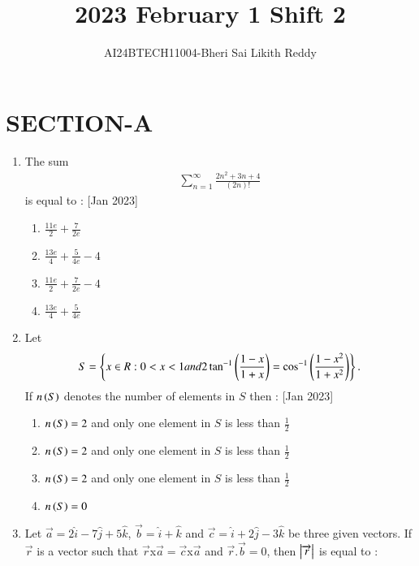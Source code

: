 \documentclass[journal]{IEEEtran}
\begin{document}

\onecolumn
\newpage
\title{2023 February 1 Shift 2}
\author{AI24BTECH11004-Bheri Sai Likith Reddy}
\maketitle
\section{SECTION-A}
\begin{enumerate}
       \item The sum 
            \begin{align*}
	       \sum_{n=1}^\infty \frac{2n^2+3n+4}{(2n)!}
            \end{align*}
	is equal to :
	\hfill{[Jan 2023]}
	       \begin{enumerate}
		       \item $\frac{11e}{2}+\frac{7}{2e}$
		       \item $\frac{13e}{4}+\frac{5}{4e}-4$
		       \item $\frac{11e}{2}+\frac{7}{2e}-4$
		       \item $\frac{13e}{4}+\frac{5}{4e}$
        	\end{enumerate}	
	\item Let 
             \begin{align*}  
		S=\left\{x\in R: 0<x<1 and 2\tan ^{-1}\left(\frac{1-x}{1+x}\right)=\cos ^{-1}\left(\frac{1-x^2}{1+x^2}\right)\right\}.
              \end{align*}
	 If $n\left(S\right)$ denotes the number of elements in $S$ then :
	\hfill{[Jan 2023]}               
               \begin{enumerate}
			       \item $n\left(S\right)=2$ and only one element in $S$ is less than $\frac{1}{2}$
                                \item $n\left(S\right)=2$ and only one element in $S$ is less than $\frac{1}{2}$
				\item $n\left(S\right)=2$ and only one element in $S$ is less than $\frac{1}{2}$ 
                                \item $n\left(S\right)=0$
	       \end{enumerate}	
       \item Let $\overrightarrow{a}=2\hat{i}-7\hat{j}+5\hat{k}$, $\overrightarrow{b}=\hat{i}+\hat{k}$ and $\overrightarrow{c}=\hat{i}+2\hat{j}-3\hat{k}$ be three given vectors. If $\overrightarrow{r}$ is a vector such that $\overrightarrow{r}$x$\overrightarrow{a}=\overrightarrow{c}$x$\overrightarrow{a}$ and $\overrightarrow{r}.\overrightarrow{b}=0$, then $\left\vert\overrightarrow{r}\right\vert$ is equal to :

\end{enumerate}
\end{document}
